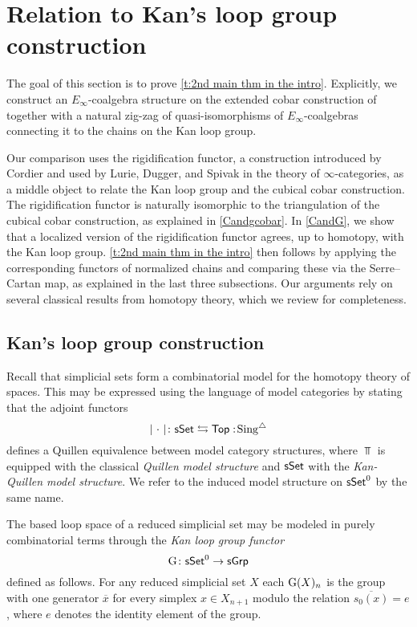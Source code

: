 
\section{Relation to Kan's loop group construction} \label{s:theorem2}

The goal of this section is to prove \cref{t:2nd main thm in the intro}.
Explicitly, we construct an $E_{\infty}$-coalgebra structure on the extended cobar construction of \cite{hess2010cobar} together with a natural zig-zag of quasi-isomorphisms of $E_{\infty}$-coalgebras connecting it to the chains on the Kan loop group.

Our comparison uses the rigidification functor, a construction introduced by Cordier and used by Lurie, Dugger, and Spivak in the theory of $\infty$-categories, as a middle object to relate the Kan loop group and the cubical cobar construction.
The rigidification functor is naturally isomorphic to the triangulation of the cubical cobar construction, as explained in \cref{Candgcobar}.
In \cref{CandG}, we show that a localized version of the rigidification functor agrees, up to homotopy, with the Kan loop group.
\cref{t:2nd main thm in the intro} then follows by applying the corresponding functors of normalized chains and comparing these via the Serre--Cartan map, as explained in the last three subsections.
Our arguments rely on several classical results from homotopy theory, which we review for completeness.

\subsection{Kan's loop group construction}

Recall that simplicial sets form a combinatorial model for the homotopy theory of spaces.
This may be expressed using the language of model categories by stating that the adjoint functors
\[
\lvert\ \cdot\ \rvert \colon \mathsf{sSet} \leftrightarrows \mathsf{Top} :\! \operatorname{Sing^{\triangle}}
\]
defines a Quillen equivalence between model category structures, where $\Top$ is equipped with the classical \textit{Quillen model structure} and $\mathsf{sSet}$ with the \textit{Kan-Quillen model structure}.
We refer to the induced model structure on $\mathsf{sSet}^0$ by the same name.

The based loop space of a reduced simplicial set may be modeled in purely combinatorial terms through the \textit{Kan loop group functor}
\[
\operatorname{G} \colon \mathsf{sSet}^0 \to \mathsf{sGrp}
\]
defined as follows.
For any reduced simplicial set $X$ each $\operatorname{G}(X)_n$ is the group with one generator $\overline{x}$ for every simplex $x \in X_{n+1}$ modulo the relation $\overline{s_0(x)} = e$, where $e$ denotes the identity element of the group.

